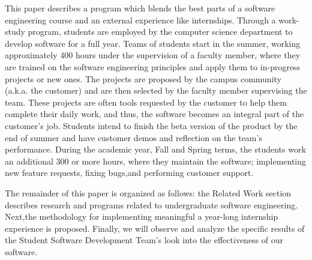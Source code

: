 This paper describes a program which blends the best parts of a software engineering course and an external experience like internships. Through a work-study program, students are employed by the computer science department to develop software for a full year. Teams of students start in the summer, working approximately 400 hours under the supervision of a faculty member, where they are trained on the software engineering principles and apply them to in-progress projects or new ones. The projects are proposed by the campus community (a.k.a. the customer) and are then selected by the faculty member supervising the team. These projects are often tools requested by the customer to help them complete their daily work, and thus, the software becomes an integral part of the customer's job. Students intend to finish the beta version of the product by the end of summer and have customer demos and reflection on the team's performance. During the academic year, Fall and Spring terms, the students work an additional 300 or more hours, where they maintain the software; implementing new feature requests, fixing bugs,and performing customer support. 

The remainder of this paper is organized as follows: the Related Work section describes research and programs related to undergraduate software engineering. Next,the methodology for implementing meaningful a year-long internship experience is proposed. Finally, we will observe and analyze the specific results of the Student Software Development Team's look into the effectiveness of our software.

